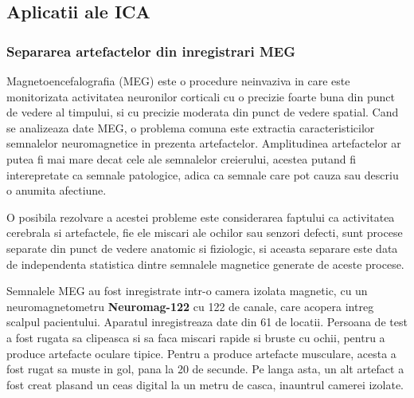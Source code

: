 \documentclass[12pt,oneside]{article}
\begin{document}
\subsection{Aplicatii ale ICA } 
\subsubsection{Separarea artefactelor din inregistrari MEG}
Magnetoencefalografia (MEG) este o procedure neinvaziva in care este monitorizata activitatea neuronilor corticali cu o precizie foarte buna din punct de vedere al timpului, si cu precizie moderata din punct de vedere spatial. Cand se analizeaza date MEG, o problema comuna este extractia caracteristicilor semnalelor neuromagnetice in prezenta artefactelor. Amplitudinea artefactelor ar putea fi mai mare decat cele ale semnalelor creierului, acestea putand fi interepretate ca semnale patologice, adica ca semnale care pot cauza sau descriu o anumita afectiune.

O posibila rezolvare a acestei probleme este considerarea faptului ca activitatea cerebrala si artefactele, fie ele miscari ale ochilor sau senzori defecti, sunt procese separate din punct de vedere anatomic si fiziologic, si aceasta separare este data de independenta statistica dintre semnalele magnetice generate de aceste procese.

Semnalele MEG au fost inregistrate intr-o camera izolata magnetic, cu un neuromagnetometru \textbf{Neuromag-122} cu 122 de canale, care acopera intreg scalpul pacientului. Aparatul inregistreaza date din 61 de locatii. Persoana de test a fost rugata sa clipeasca si sa faca miscari rapide si bruste cu ochii, pentru a produce artefacte oculare tipice. Pentru a produce artefacte musculare, acesta a fost rugat sa muste in gol, pana la 20 de secunde. Pe langa asta, un alt artefact a fost creat plasand un ceas digital la un metru de casca, inauntrul camerei izolate.
\end{document}
